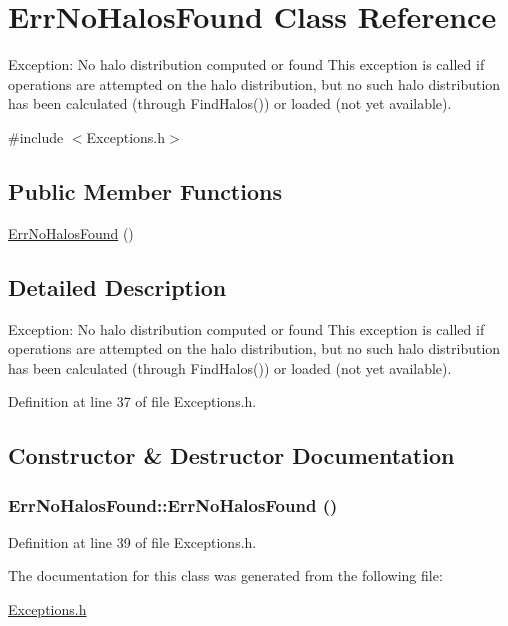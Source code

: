 \section{ErrNoHalosFound Class Reference}
\label{classErrNoHalosFound}


Exception: No halo distribution computed or found This exception is called if operations are attempted on the halo distribution, but no such halo distribution has been calculated (through FindHalos()) or loaded (not yet available).  




{\ttfamily \#include $<$Exceptions.h$>$}

\subsection*{Public Member Functions}
\begin{DoxyCompactItemize}
\item 
\hyperlink{classErrNoHalosFound_a3e8455d1033ed2cd7b073f71dbc0c7e4}{ErrNoHalosFound} ()
\end{DoxyCompactItemize}


\subsection{Detailed Description}
Exception: No halo distribution computed or found This exception is called if operations are attempted on the halo distribution, but no such halo distribution has been calculated (through FindHalos()) or loaded (not yet available). 

Definition at line 37 of file Exceptions.h.



\subsection{Constructor \& Destructor Documentation}
\subsubsection[{ErrNoHalosFound}]{\setlength{\rightskip}{0pt plus 5cm}ErrNoHalosFound::ErrNoHalosFound ()}\label{classErrNoHalosFound_a3e8455d1033ed2cd7b073f71dbc0c7e4}


Definition at line 39 of file Exceptions.h.



The documentation for this class was generated from the following file:\begin{DoxyCompactItemize}
\item 
\hyperlink{Exceptions_8h}{Exceptions.h}\end{DoxyCompactItemize}
